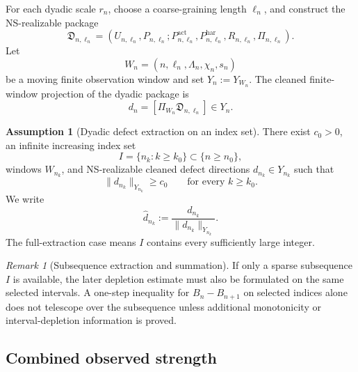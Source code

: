 \documentclass[11pt]{article}
\numberwithin{equation}{section}
\theoremstyle{plain}
\theoremstyle{definition}
\newtheorem{assumption}[theorem]{Assumption}
\theoremstyle{remark}
\newtheorem{remark}[theorem]{Remark}
\newcommand{\har}{\mathrm{har}}
\newcommand{\act}{\mathrm{act}}
\begin{document}
For each dyadic scale \(r_n\), choose a coarse-graining length \(\ell_n\), and
construct the NS-realizable package
\[
        \mathfrak D_{n,\ell_n}
        =
        (U_{n,\ell_n},P_{n,\ell_n};P^{\act}_{n,\ell_n},P^{\har}_{n,\ell_n},R_{n,\ell_n},\Pi_{n,\ell_n}).
\]
Let
\[
        W_n=(n,\ell_n,\Lambda_n,\chi_n,s_n)
\]
be a moving finite observation window and set \(Y_n:=Y_{W_n}\).  The cleaned
finite-window projection of the dyadic package is
\[
        d_n=[\Pi_{W_n}\mathfrak D_{n,\ell_n}]\in Y_n .
\]

\begin{assumption}[Dyadic defect extraction on an index set]
\label{ass:dyadic-defect-extraction-final}
There exist \(c_0>0\), an infinite increasing index set
\[
        I=\{n_k:k\ge k_0\}\subset\{n\ge n_0\},
\]
windows \(W_{n_k}\), and NS-realizable cleaned defect directions
\(d_{n_k}\in Y_{n_k}\) such that
\begin{equation}
        \|d_{n_k}\|_{Y_{n_k}}\ge c_0
        \qquad
        \text{for every }k\ge k_0.
        \label{eq:extracted-defect-lower-bound}
\end{equation}
We write
\[
        \widehat d_{n_k}
        :=
        \frac{d_{n_k}}{\|d_{n_k}\|_{Y_{n_k}}}.
\]
The full-extraction case means \(I\) contains every sufficiently large integer.
\end{assumption}

\begin{remark}[Subsequence extraction and summation]
If only a sparse subsequence \(I\) is available, the later depletion estimate
must also be formulated on the same selected intervals.  A one-step inequality
for \(B_n-B_{n+1}\) on selected indices alone does not telescope over the
subsequence unless additional monotonicity or interval-depletion information is
proved.
\end{remark}

\subsection{Combined observed strength}
\end{document}
